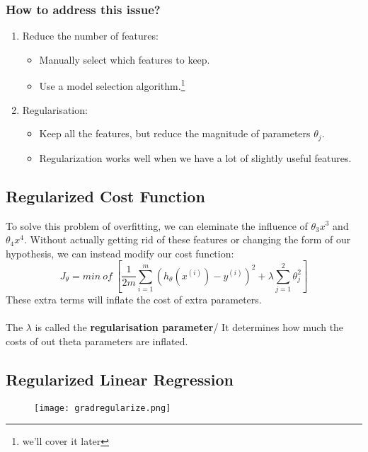     \subsubsection{How to address this issue?}
      \begin{enumerate}
        \item Reduce the number of features:
        \begin{itemize}
          \item Manually select which features to keep.
          \item Use a model selection algorithm.\footnote[2]{we'll cover it later}
        \end{itemize}
        \item Regularisation:
        \begin{itemize}
          \item Keep all the features, but reduce the magnitude of parameters $\theta_j$.
          \item Regularization works well when we have a lot of slightly useful features.
        \end{itemize}
      \end{enumerate}

  \subsection{Regularized Cost Function}
    To solve this problem of overfitting, we can eleminate the influence of $\theta_3x^3$ and $\theta_4x^4$. Without actually getting rid of these features or changing the form of our hypothesis, we can instead modify our cost function:
    \begin{equation}
      J_\theta = min\ of\ \left[ \frac{1}{2m} \sum_{i=1}^{m}(h_\theta(x^{(i)}) - y^{(i)})^2 + \lambda\sum_{j=1}^2\theta_j^2 \right]
    \end{equation}
    These extra terms will inflate the cost of extra parameters. \\ \\
    The $\lambda$ is called the \textbf{regularisation parameter}/ It determines how much the costs of out theta parameters are inflated.

  \subsection{Regularized Linear Regression}
    \begin{figure}[h]
      \centering
      \texttt{[image: gradregularize.png]}
    \end{figure}


